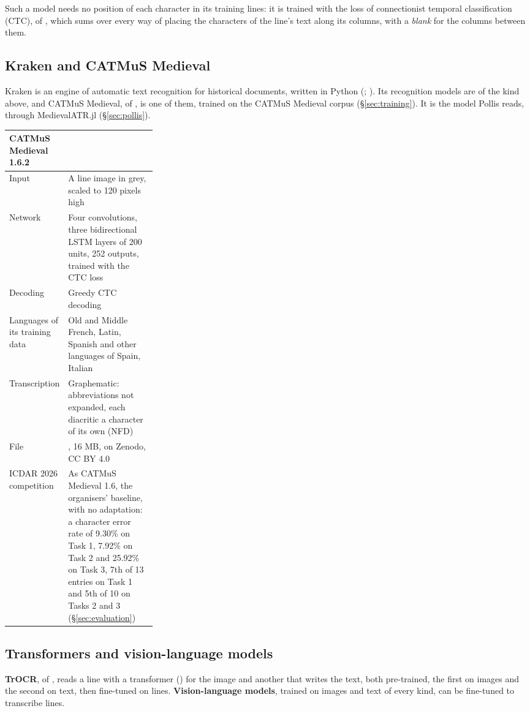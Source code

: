 Such a model needs no position of each character in its training lines: it is trained with the loss of
connectionist temporal classification (CTC), of ,
which sums over every way of placing the characters of the line's text along its columns, with a \emph{blank} for
the columns between them.

\subsection{Kraken and CATMuS Medieval}
Kraken is an engine of automatic text recognition for historical documents, written in Python
(; ). Its recognition models are of the kind
above, and CATMuS Medieval, of , is one of them, trained on the
CATMuS Medieval corpus (\S\ref{sec:training}). It is the model Pollis reads, through MedievalATR.jl (\S\ref{sec:pollis}).

\begin{center}\small
\begin{tabularx}{\linewidth}{@{}p{0.28\linewidth}L@{}}
\toprule
\textbf{CATMuS Medieval 1.6.2} & \\
\midrule
Input & A line image in grey, scaled to 120 pixels high \\
Network & Four convolutions, three bidirectional LSTM layers of 200 units, 252 outputs, trained with the CTC loss \\
Decoding & Greedy CTC decoding \\
Languages of its training data & Old and Middle French, Latin, Spanish and other languages of Spain, Italian \\
Transcription & Graphematic: abbreviations not expanded, each diacritic a character of its own (NFD) \\
File & , 16 MB, on Zenodo, CC BY 4.0 \\
ICDAR 2026 competition & As CATMuS Medieval 1.6, the organisers' baseline, with no adaptation: a character error
  rate of 9.30\% on Task 1, 7.92\% on Task 2 and 25.92\% on Task 3, 7th of 13 entries on Task 1 and 5th of 10 on
  Tasks 2 and 3 (\S\ref{sec:evaluation}) \\
\bottomrule
\end{tabularx}
\end{center}

\subsection{Transformers and vision-language models}
\textbf{TrOCR}, of , reads a line with a transformer
() for the image and another that writes the text, both
pre-trained, the first on images and the second on text, then fine-tuned on lines. \textbf{Vision-language models},
trained on images and text of every kind, can be fine-tuned to transcribe lines.

